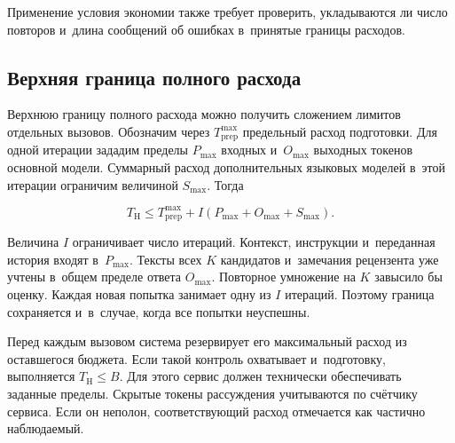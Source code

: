 Применение условия экономии также требует проверить, укладываются ли число повторов и~длина сообщений об ошибках в~принятые границы расходов.

\subsection{Верхняя граница полного расхода}
Верхнюю границу полного расхода можно получить сложением лимитов отдельных вызовов. Обозначим через $T_{\mathrm{prep}}^{\max}$ предельный расход подготовки. Для одной итерации зададим пределы $P_{\max}$ входных и~$O_{\max}$ выходных токенов основной модели. Суммарный расход дополнительных языковых моделей в~этой итерации ограничим величиной $S_{\max}$. Тогда
\begin{formulakey}
\begin{equation}
T_{\mathrm{H}}\le T_{\mathrm{prep}}^{\max}+I(P_{\max}+O_{\max}+S_{\max}).
\label{eq:worst}
\end{equation}
\begin{symbols}
\end{symbols}
\end{formulakey}
Величина $I$ ограничивает число итераций. Контекст, инструкции и~переданная история входят в~$P_{\max}$. Тексты всех $K$ кандидатов и~замечания рецензента уже учтены в~общем пределе ответа $O_{\max}$. Повторное умножение на $K$ завысило бы оценку. Каждая новая попытка занимает одну из $I$ итераций. Поэтому граница сохраняется и~в~случае, когда все попытки неуспешны.

Перед каждым вызовом система резервирует его максимальный расход из оставшегося бюджета. Если такой контроль охватывает и~подготовку, выполняется $T_{\mathrm{H}}\le B$. Для этого сервис должен технически обеспечивать заданные пределы. Скрытые токены рассуждения учитываются по счётчику сервиса. Если он неполон, соответствующий расход отмечается как частично наблюдаемый.

